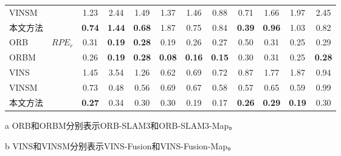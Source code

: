 \begin{table}
\begin{threeparttable}
\begin{tabular}{lccccccccccc}
VINSM &                       & 1.23          & 2.44          & 1.49          & 1.37          & 1.46          & 0.88          & 0.71          & 1.66          & 1.97          & 2.45          \\
本文方法    &                       & \cellcolor[HTML]{FFCCC9}\textbf{0.74} & \cellcolor[HTML]{FFCCC9}\textbf{1.44} & \cellcolor[HTML]{FFCCC9}\textbf{0.68} & 1.87          & 0.75          & 0.84          & \cellcolor[HTML]{FFCCC9}\textbf{0.39} & \cellcolor[HTML]{FFCCC9}\textbf{0.96} & 1.03          & 0.82          \\ \midrule
ORB   & \multirow{5}{*}{$RPE_r$\textdownarrow{}} & 0.31          & \cellcolor[HTML]{FFCCC9}\textbf{0.19} & \cellcolor[HTML]{FFCCC9}\textbf{0.28} & 0.19          & 0.26          & 0.27          & 0.50          & 0.31          & 0.25          & 0.29          \\
ORBM  &                       & 0.26          & \cellcolor[HTML]{FFCCC9}\textbf{0.19} & \cellcolor[HTML]{FFCCC9}\textbf{0.28} & \cellcolor[HTML]{FFCCC9}\textbf{0.08} & \cellcolor[HTML]{FFCCC9}\textbf{0.16} & \cellcolor[HTML]{FFCCC9}\textbf{0.15} & 0.30          & 0.31          & 0.25          & \cellcolor[HTML]{FFCCC9}\textbf{0.28} \\
VINS  &                       & 1.45          & 3.54          & 1.26          & 0.62          & 0.69          & 0.72          & 0.87          & 1.77          & 1.87          & 0.94          \\
VINSM &                       & 0.73          & 0.48          & 0.56          & 0.69          & 0.67          & 0.58          & 0.57          & 0.65          & 0.59          & 0.99          \\
本文方法    &                       & \cellcolor[HTML]{FFCCC9}\textbf{0.27} & 0.34          & 0.30          & 0.30          & 0.19          & 0.17          & \cellcolor[HTML]{FFCCC9}\textbf{0.26} & \cellcolor[HTML]{FFCCC9}\textbf{0.29} & \cellcolor[HTML]{FFCCC9}\textbf{0.19} & 0.30          \\ \bottomrule
\end{tabular}
\label{tab:loc_kitti}
\begin{tablenotes}
  \item [a] ORB和ORBM分别表示ORB-SLAM3和ORB-SLAM3-Map。
  \item [b] VINS和VINSM分别表示VINS-Fusion和VINS-Fusion-Map。
\end{tablenotes}
\end{threeparttable}
\end{table}


